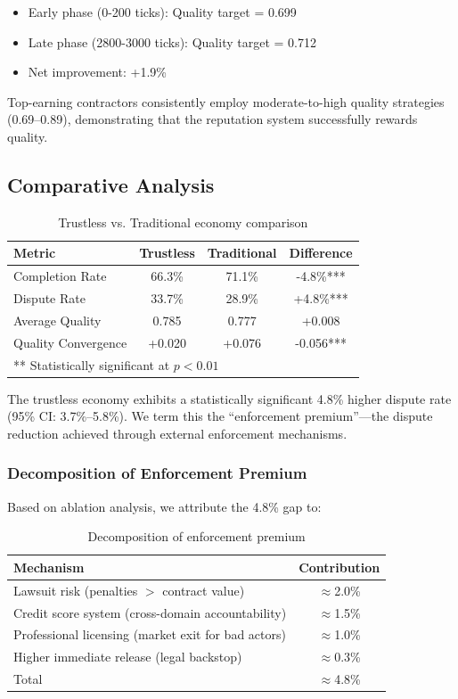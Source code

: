 \documentclass[11pt,a4paper]{article}
\begin{document}
\begin{itemize}
    \item Early phase (0-200 ticks): Quality target = 0.699
    \item Late phase (2800-3000 ticks): Quality target = 0.712
    \item Net improvement: +1.9\%
\end{itemize}

Top-earning contractors consistently employ moderate-to-high quality strategies (0.69--0.89), demonstrating that the reputation system successfully rewards quality.

\subsection{Comparative Analysis}

\begin{table}[H]
\centering
\caption{Trustless vs. Traditional economy comparison}
\label{tab:comparison}
\begin{tabular}{lccc}
\toprule
Metric & Trustless & Traditional & Difference \\
\midrule
Completion Rate & 66.3\% & 71.1\% & -4.8\%*** \\
Dispute Rate & 33.7\% & 28.9\% & +4.8\%*** \\
Average Quality & 0.785 & 0.777 & +0.008 \\
Quality Convergence & +0.020 & +0.076 & -0.056*** \\
\bottomrule
\multicolumn{4}{l}{\small *** Statistically significant at $p < 0.01$}
\end{tabular}
\end{table}

The trustless economy exhibits a statistically significant 4.8\% higher dispute rate (95\% CI: 3.7\%--5.8\%). We term this the ``enforcement premium''---the dispute reduction achieved through external enforcement mechanisms.

\subsubsection{Decomposition of Enforcement Premium}

Based on ablation analysis, we attribute the 4.8\% gap to:

\begin{table}[H]
\centering
\caption{Decomposition of enforcement premium}
\label{tab:decomp}
\begin{tabular}{lc}
\toprule
Mechanism & Contribution \\
\midrule
Lawsuit risk (penalties $>$ contract value) & $\approx$2.0\% \\
Credit score system (cross-domain accountability) & $\approx$1.5\% \\
Professional licensing (market exit for bad actors) & $\approx$1.0\% \\
Higher immediate release (legal backstop) & $\approx$0.3\% \\
\midrule
Total & $\approx$4.8\% \\
\bottomrule
\end{tabular}
\end{table}
\end{document}

